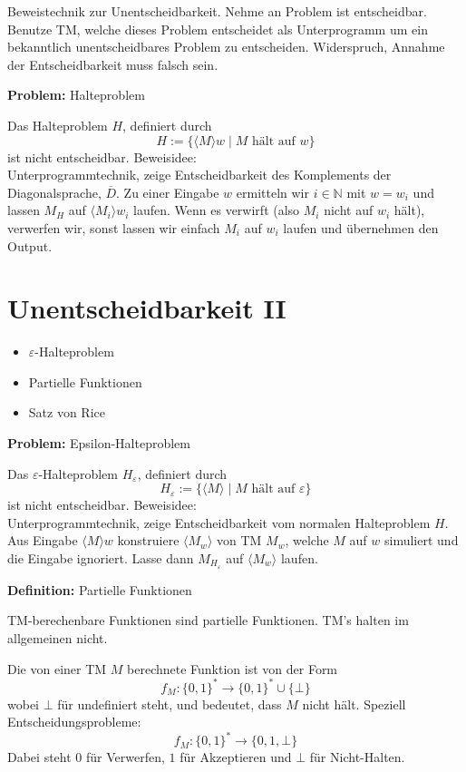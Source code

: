 \documentclass[a4paper,graphics,11pt]{article}
\newcommand{\eps}[0]{\varepsilon}
\begin{document}
Beweistechnik zur Unentscheidbarkeit. Nehme an Problem ist entscheidbar. Benutze TM, welche dieses
Problem entscheidet als Unterprogramm um ein bekanntlich unentscheidbares Problem zu entscheiden.
Widerspruch, Annahme der Entscheidbarkeit muss falsch sein.

\strut

\textbf{Problem:} Halteproblem

Das Halteproblem $H$, definiert durch
$$
    H := \{\langle M \rangle w \mid M \text{ hält auf } w\}
$$
ist nicht entscheidbar. Beweisidee:\\
Unterprogrammtechnik, zeige Entscheidbarkeit
des Komplements der Diagonalsprache, $\overline{D}$. Zu einer Eingabe $w$ ermitteln
wir $i \in \mathbb{N}$ mit $w = w_i$ und lassen $M_H$ auf $\langle M_i \rangle w_i$ laufen.
Wenn es verwirft (also $M_i$ nicht auf $w_i$ hält), verwerfen wir, sonst lassen wir einfach
$M_i$ auf $w_i$ laufen und übernehmen den Output.



\newpage



\section{Unentscheidbarkeit II}


\begin{itemize}
    \item $\eps$-Halteproblem
    \item Partielle Funktionen
    \item Satz von Rice
\end{itemize}


\textbf{Problem:} Epsilon-Halteproblem

Das $\eps$-Halteproblem $H_\eps$, definiert durch
$$
    H_\eps := \{\langle M \rangle \mid M \text{ hält auf } \eps\}
$$
ist nicht entscheidbar. Beweisidee:\\
Unterprogrammtechnik, zeige Entscheidbarkeit vom normalen Halteproblem $H$.
Aus Eingabe $\langle M \rangle w$ konstruiere $\langle M_w\rangle$ von TM $M_w$, welche $M$ auf $w$ simuliert
und die Eingabe ignoriert. Lasse dann $M_{H_\eps}$ auf $\langle M_w\rangle$ laufen.

\strut

\textbf{Definition:} Partielle Funktionen

TM-berechenbare Funktionen sind partielle Funktionen. TM's halten im allgemeinen nicht.

Die von einer TM $M$ berechnete Funktion ist von der Form
$$
    f_M : \{0,1\}^* \to \{0,1\}^* \cup \{\bot\}
$$
wobei $\bot$ für undefiniert steht, und bedeutet, dass $M$ nicht hält. Speziell Entscheidungsprobleme:
$$
    f_M : \{0,1\}^* \to \{0,1,\bot\}
$$
Dabei steht $0$ für Verwerfen, $1$ für Akzeptieren und $\bot$ für Nicht-Halten.
\end{document}
